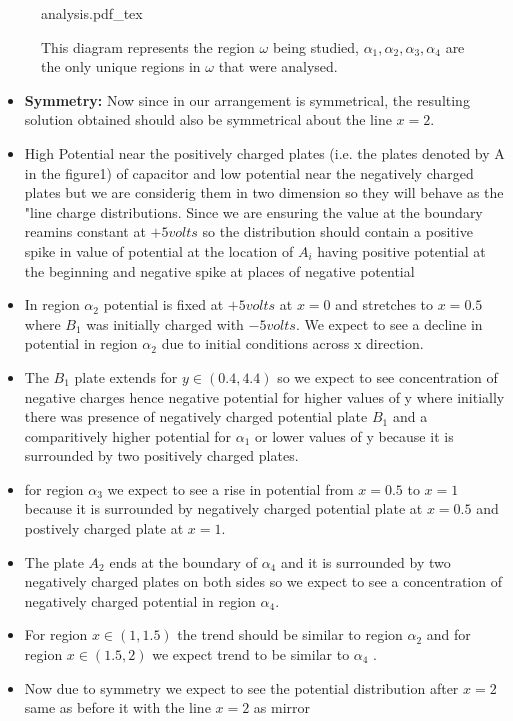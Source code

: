 \begin{figure}[ht]
    \centering
    \def\svgwidth{0.6\textwidth}
    {analysis.pdf_tex}
    \caption{This diagram represents the region $\omega$ being studied, $\alpha_1,\alpha_2,\alpha_3,\alpha_4$ are the only unique regions in $\omega$ that were analysed.}
    \label{}
\end{figure}
\begin{itemize}
    \item \textbf{Symmetry: } Now since in our arrangement is symmetrical, the resulting solution obtained should also be symmetrical about the line $x = 2$. 
    \item High Potential near the positively charged plates (i.e. the plates denoted by A  in the figure1) of capacitor and low potential near the negatively charged plates but we are considerig them in two dimension so they will behave as the "line charge distributions. Since we are ensuring the value at the boundary reamins constant at $ +5 volts $ so the distribution should contain a positive spike in value of potential at the location of $A_i$  having positive potential at the beginning and negative spike at places of negative potential
    \item  In region $ \alpha_2 $ potential is fixed at $ + 5 volts $ at $ x = 0 $ and stretches to $ x = 0.5 $ where $ B_1 $ was initially charged with $ - 5 volts $. We expect to see a decline in potential in region $ \alpha_2 $ due to initial conditions across x direction.
    \item The  $ B_1 $ plate extends for $ y \in (0.4, 4.4)  $ so we expect to see concentration of negative charges hence negative potential  for  higher values  of y where initially there was presence of negatively charged potential plate $ B_1 $ and a comparitively higher potential for $ \alpha_1 $ or lower values of y because it is surrounded by two positively charged plates.
    \item for region $ \alpha_3   $  we expect to see a rise  in potential from $ x = 0.5 $ to $ x = 1 $  because it is surrounded by negatively charged potential plate at $ x = 0.5 $ and postively charged plate at  $ x = 1 $.
    \item The plate $ A_2 $ ends at the boundary of $ \alpha_4 $ and it is surrounded by two negatively charged plates on both sides so we expect to see a concentration of negatively charged potential in region $ \alpha_4 $.
    \item For region $ x \in (1 , 1.5) $ the trend should be similar to region $ \alpha_2 $ and for region $ x \in (1.5, 2) $ we expect  trend to be similar to $ \alpha_4 $ . 
    \item Now due to symmetry we expect to see the potential distribution after $ x = 2 $ same as before it with the line $ x = 2 $ as mirror
\end{itemize}

